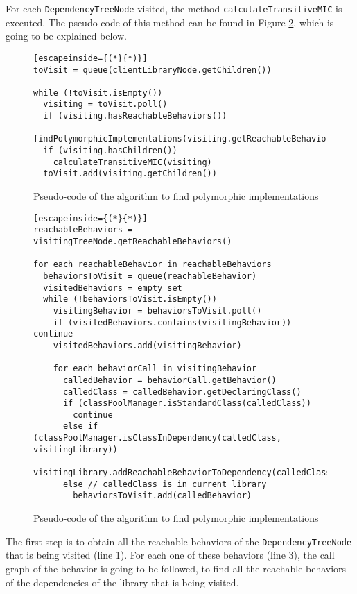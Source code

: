For each \texttt{DependencyTreeNode} visited, the method \texttt{calculateTransitiveMIC} is executed. The pseudo-code of this method can be found in Figure \ref{fig:calculate-tmic}, which is going to be explained below.

\begin{figure}[ht!]
\begin{lstlisting}[escapeinside={(*}{*)}]
toVisit = queue(clientLibraryNode.getChildren())

while (!toVisit.isEmpty())
  visiting = toVisit.poll()
  if (visiting.hasReachableBehaviors())
    findPolymorphicImplementations(visiting.getReachableBehaviors())
  if (visiting.hasChildren())
    calculateTransitiveMIC(visiting)
  toVisit.add(visiting.getChildren())
\end{lstlisting}
\caption{Pseudo-code of the algorithm to find polymorphic implementations}
\label{fig:tree-traversing-tmic}
\end{figure}

\begin{figure}[ht!]
\begin{lstlisting}[escapeinside={(*}{*)}]
reachableBehaviors = visitingTreeNode.getReachableBehaviors()

for each reachableBehavior in reachableBehaviors
  behaviorsToVisit = queue(reachableBehavior)
  visitedBehaviors = empty set
  while (!behaviorsToVisit.isEmpty())
    visitingBehavior = behaviorsToVisit.poll()
    if (visitedBehaviors.contains(visitingBehavior)) continue
    visitedBehaviors.add(visitingBehavior)

    for each behaviorCall in visitingBehavior
      calledBehavior = behaviorCall.getBehavior()
      calledClass = calledBehavior.getDeclaringClass()
      if (classPoolManager.isStandardClass(calledClass))
        continue
      else if (classPoolManager.isClassInDependency(calledClass, visitingLibrary))
        visitingLibrary.addReachableBehaviorToDependency(calledClass)
      else // calledClass is in current library
        behaviorsToVisit.add(calledBehavior)
\end{lstlisting}
\caption{Pseudo-code of the algorithm to find polymorphic implementations}
\label{fig:calculate-tmic}
\end{figure}

The first step is to obtain all the reachable behaviors of the \texttt{DependencyTreeNode} that is being visited (line 1). For each one of these behaviors (line 3), the call graph of the behavior is going to be followed, to find all the reachable behaviors of the dependencies of the library that is being visited.

